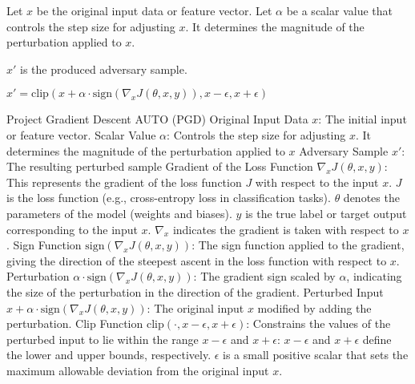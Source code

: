 Let $x$ be the original input data or feature vector. Let $\alpha$ be a scalar value that controls the step size for adjusting $x$. It determines the magnitude of the perturbation applied to $x$.

$x'$ is the produced adversary sample.

$x' = \text{clip}(x + \alpha \cdot \text{sign}(\nabla_x J(\theta, x, y)), x - \epsilon, x + \epsilon)$

Project Gradient Descent AUTO (PGD) Original Input Data $x$: The initial input or feature vector.
Scalar Value $\alpha$: Controls the step size for adjusting $x$. It determines the magnitude of the perturbation applied to $x$
Adversary Sample $x'$: The resulting perturbed sample
Gradient of the Loss Function $\nabla_x J(\theta, x, y)$: This represents the gradient of the loss function $J$ with respect to the input $x$.
$J$ is the loss function (e.g., cross-entropy loss in classification tasks).
$\theta$ denotes the parameters of the model (weights and biases).
$y$ is the true label or target output corresponding to the input $x$.
$\nabla_x$ indicates the gradient is taken with respect to $x$.
Sign Function $\text{sign}(\nabla_x J(\theta, x, y))$: The sign function applied to the gradient, giving the direction of the steepest ascent in the loss function with respect to $x$.
Perturbation $\alpha \cdot \text{sign}(\nabla_x J(\theta, x, y))$: The gradient sign scaled by $\alpha$, indicating the size of the perturbation in the direction of the gradient.
Perturbed Input $x + \alpha \cdot \text{sign}(\nabla_x J(\theta, x, y))$: The original input $x$ modified by adding the perturbation.
Clip Function $\text{clip}(\cdot, x - \epsilon, x + \epsilon)$: Constrains the values of the perturbed input to lie within the range $x - \epsilon$ and $x + \epsilon$:
$x - \epsilon$ and $x + \epsilon$ define the lower and upper bounds, respectively.
$\epsilon$ is a small positive scalar that sets the maximum allowable deviation from the original input $x$.
